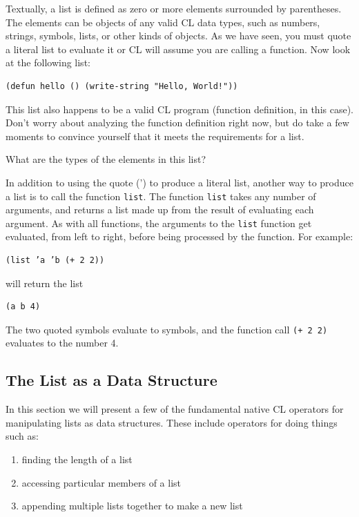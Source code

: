 \documentclass [11pt]{book}
\begin{document}
Textually, a list is defined as zero or more elements surrounded by
parentheses. The elements can be objects of any valid CL data types,
such as numbers, strings, symbols, lists, or other kinds of
objects. As we have seen, you must quote a literal list to evaluate it
or CL will assume you are calling a function. Now look at the
following list:

\begin{verbatim}(defun hello () (write-string "Hello, World!"))
\end{verbatim}This list also happens to be a valid CL program (function definition,
in this case). Don't worry about analyzing the function definition
right now, but do take a few moments to convince yourself that it
meets the requirements for a list.



What are the types of the elements in this list?



In addition to using the quote (') to produce a literal list, another
way to produce a list is to call the function \texttt{list}. The function \texttt{list} takes any number of arguments, and returns a list made up
from the result of evaluating each argument. As with all functions,
the arguments to the \texttt{list} function get evaluated, from left to right, before being
processed by the function. For example:

\begin{verbatim}(list ’a ’b (+ 2 2))
\end{verbatim}will return the list

\begin{verbatim}(a b 4)
\end{verbatim}The two quoted symbols evaluate to symbols, and the function
call \texttt{(+ 2 2)} evaluates to the number 4.



\subsection{The List as a Data Structure}

\label{subsec:thelistasadatastructure}

In this section we will present a few of the fundamental native CL operators for manipulating
lists as data structures. These include operators for doing things such as:

\begin{enumerate}

\item finding the length of a list

\item accessing particular members of a list

\item appending multiple lists together to make a new list

\end{enumerate}
\end{document}
